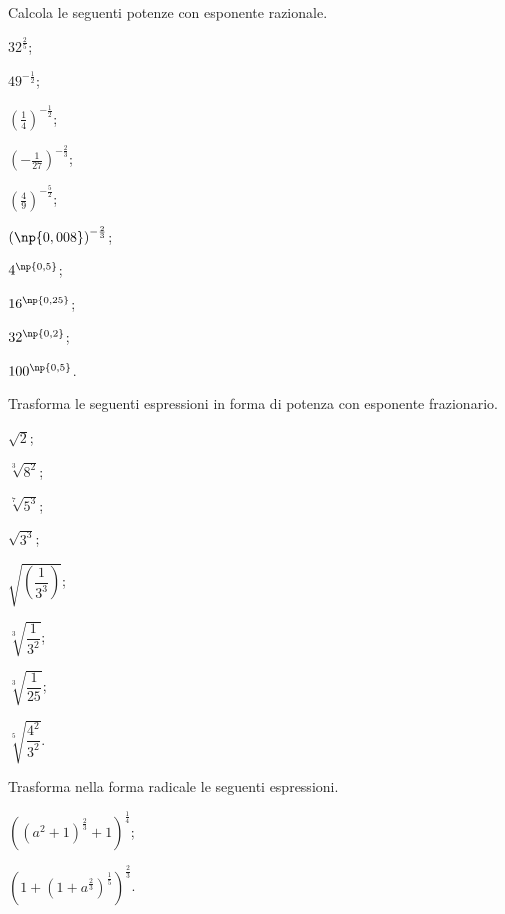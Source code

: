 \begin{esercizio}[\Ast]
 \label{ese:2.19}
Calcola le seguenti potenze con esponente razionale.
 \begin{multicols}{3}
 \begin{enumeratea}
 \item $32^{\frac 2 5}$;
 \item $49^{-\frac 1 2}$;
 \item $\left(\frac 1 4\right)^{-\frac 1 2}$;
 \item $\left(-\frac 1{27}\right)^{-\frac 2 3}$;
 \item $\left(\frac 4 9\right)^{-\frac 5 2}$;
 \item $\left(\np{0,008}\right)^{-\frac 2 3}$;
 \item $4^{\np{0,5}}$;
 \item $16^{\np{0,25}}$;
 \item $32^{\np{0,2}}$;
 \item $100^{\np{0,5}}$.
 \end{enumeratea}
 \end{multicols}
\end{esercizio}

\begin{esercizio}[\Ast]
 \label{ese:2.20}
Trasforma le seguenti espressioni in forma di potenza con esponente frazionario.
 \begin{multicols}{3}
 \begin{enumeratea}
 \item $\sqrt 2$;
 \item $\sqrt[3]{8^2}$;
 \item $\sqrt[7]{5^3}$;
 \item $\sqrt{3^3}$;
 \item $\sqrt{\left(\dfrac 1{3^3}\right)}$;
 \item $\sqrt[3]{\dfrac 1{3^2}}$;
 \item $\sqrt[3]{\dfrac 1{25}}$;
 \item $\sqrt[5]{\dfrac{4^2}{3^2}}$.
 \end{enumeratea}
 \end{multicols}
\end{esercizio}

\begin{esercizio}[\Ast]
\label{ese:2.21}
 Trasforma nella forma radicale le seguenti espressioni.
 \begin{multicols}{2}
 \begin{enumeratea}
 \item $\left(\left(a^2+1\right)^{\frac 2 3}+1\right)^{\frac 1 4}$;
 \item $\left(1+\left(1+a^{\frac 2 3}\right)^{\frac 1 5}\right)^{\frac 2 3}$.
 \end{enumeratea}
 \end{multicols}
\end{esercizio}

